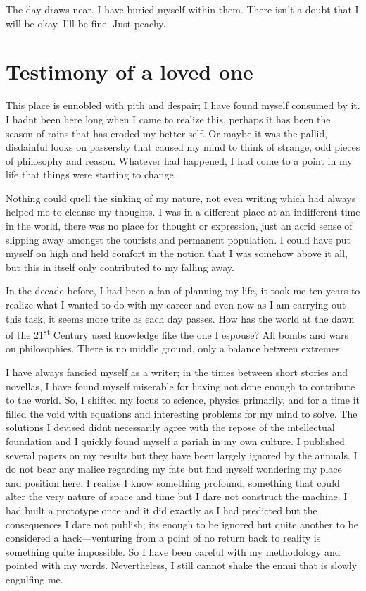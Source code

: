 The day draws near. I have buried myself within them. There isn't a
doubt that I will be okay. I'll be fine. Just peachy.

\section{Testimony of a loved one}\label{testimony-of-a-loved-one}

This place is ennobled with pith and despair; I have found myself
consumed by it. I hadn\textquotesingle t been here long when I came to
realize this, perhaps it has been the season of rains that has eroded my
better self. Or maybe it was the pallid, disdainful looks on passersby
that caused my mind to think of strange, odd pieces of philosophy and
reason. Whatever had happened, I had come to a point in my life that
things were starting to change.

Nothing could quell the sinking of my nature, not even writing which had
always helped me to cleanse my thoughts. I was in a different place at
an indifferent time in the world, there was no place for thought or
expression, just an acrid sense of slipping away amongst the tourists
and permanent population. I could have put myself on high and held
comfort in the notion that I was somehow above it all, but this in
itself only contributed to my falling away.

In the decade before, I had been a fan of planning my life, it took me
ten years to realize what I wanted to do with my career and even now as
I am carrying out this task, it seems more trite as each day passes. How
has the world at the dawn of the 21\textsuperscript{st} Century used
knowledge like the one I espouse? All bombs and wars on philosophies.
There is no middle ground, only a balance between extremes.

I have always fancied myself as a writer; in the times between short
stories and novellas, I have found myself miserable for having not done
enough to contribute to the world. So, I shifted my focus to science,
physics primarily, and for a time it filled the void with equations and
interesting problems for my mind to solve. The solutions I devised
didn\textquotesingle t necessarily agree with the repose of the
intellectual foundation and I quickly found myself a pariah in my own
culture. I published several papers on my results but they have been
largely ignored by the annuals. I do not bear any malice regarding my
fate but find myself wondering my place and position here. I realize I
know something profound, something that could alter the very nature of
space and time but I dare not construct the machine. I had built a
prototype once and it did exactly as I had predicted but the
consequences I dare not publish; it\textquotesingle s enough to be
ignored but quite another to be considered a hack---venturing from a
point of no return back to reality is something quite impossible. So I
have been careful with my methodology and pointed with my words.
Nevertheless, I still cannot shake the ennui that is slowly engulfing
me.

